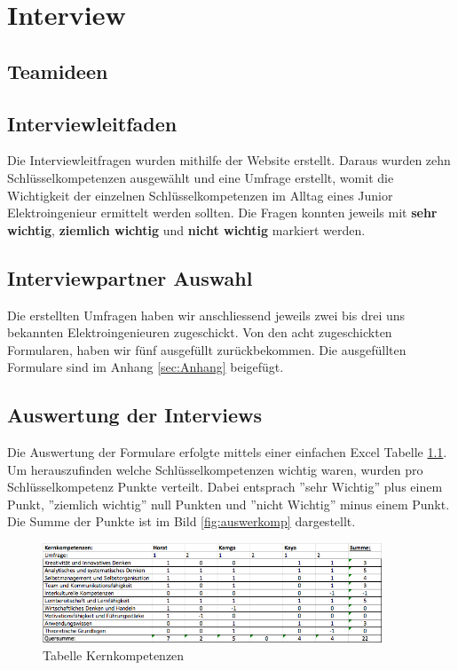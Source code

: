 
\chapter{Interview}

\section{Teamideen}

\section{Interviewleitfaden}

Die Interviewleitfragen wurden mithilfe der Website \cite{Schluesselqualifikationen} erstellt. Daraus wurden zehn Schlüsselkompetenzen ausgewählt und eine Umfrage erstellt, womit die Wichtigkeit der einzelnen Schlüsselkompetenzen im Alltag eines Junior Elektroingenieur ermittelt werden sollten. Die Fragen konnten jeweils mit \textbf{sehr wichtig}, \textbf{ziemlich wichtig} und \textbf{nicht wichtig} markiert werden.   


\section{Interviewpartner Auswahl}

Die erstellten Umfragen haben wir anschliessend jeweils zwei bis drei uns bekannten Elektroingenieuren zugeschickt. Von den acht zugeschickten Formularen, haben wir fünf ausgefüllt zurückbekommen.
Die ausgefüllten Formulare sind im Anhang \ref{sec:Anhang} beigefügt. 

\section{Auswertung der Interviews}

Die Auswertung der Formulare erfolgte mittels einer einfachen Excel Tabelle \ref{fig:tabkernkomp}. Um herauszufinden welche Schlüsselkompetenzen wichtig waren, wurden pro Schlüsselkompetenz Punkte verteilt. Dabei entsprach ''sehr Wichtig'' plus einem Punkt, ''ziemlich wichtig'' null Punkten und ''nicht Wichtig'' minus einem Punkt. Die Summe der Punkte ist im Bild \ref{fig:auswerkomp} dargestellt. 

\begin{figure}[ht]
	\centering
	\includegraphics[width=0.9\textwidth]{images/Tabelle_Kernkompetenzen.png}
	\caption{Tabelle Kernkompetenzen}
	\label{fig:tabkernkomp}
\end{figure}

